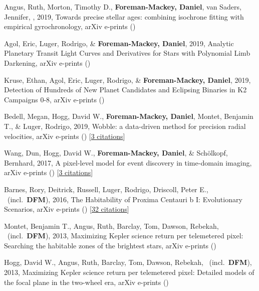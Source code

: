 \item[{\color{numcolor}\scriptsize8}] Angus, Ruth, Morton, Timothy D., \textbf{Foreman-Mackey, Daniel}, van Saders, Jennifer, \etal, 2019, Towards precise stellar ages: combining isochrone fitting with empirical gyrochronology, arXiv e-prints ()

\item[{\color{numcolor}\scriptsize7}] Agol, Eric, Luger, Rodrigo, \& \textbf{Foreman-Mackey, Daniel}, 2019, Analytic Planetary Transit Light Curves and Derivatives for Stars with Polynomial Limb Darkening, arXiv e-prints ()

\item[{\color{numcolor}\scriptsize6}] Kruse, Ethan, Agol, Eric, Luger, Rodrigo, \& \textbf{Foreman-Mackey, Daniel}, 2019, Detection of Hundreds of New Planet Candidates and Eclipsing Binaries in K2 Campaigns 0-8, arXiv e-prints ()

\item[{\color{numcolor}\scriptsize5}] Bedell, Megan, Hogg, David W., \textbf{Foreman-Mackey, Daniel}, Montet, Benjamin T., \& Luger, Rodrigo, 2019, Wobble: a data-driven method for precision radial velocities, arXiv e-prints () [\href{http://adsabs.harvard.edu/abs/2019arXiv190100503B}{3 citations}]

\item[{\color{numcolor}\scriptsize4}] Wang, Dun, Hogg, David W., \textbf{Foreman-Mackey, Daniel}, \& Sch{\"o}lkopf, Bernhard, 2017, A pixel-level model for event discovery in time-domain imaging, arXiv e-prints () [\href{http://adsabs.harvard.edu/abs/2017arXiv171002428W}{3 citations}]

\item[{\color{numcolor}\scriptsize3}] Barnes, Rory, Deitrick, Russell, Luger, Rodrigo, Driscoll, Peter E., \etal\ (incl.\ \textbf{DFM}), 2016, The Habitability of Proxima Centauri b I: Evolutionary Scenarios, arXiv e-prints () [\href{http://adsabs.harvard.edu/abs/2016arXiv160806919B}{32 citations}]

\item[{\color{numcolor}\scriptsize2}] Montet, Benjamin T., Angus, Ruth, Barclay, Tom, Dawson, Rebekah, \etal\ (incl.\ \textbf{DFM}), 2013, Maximizing Kepler science return per telemetered pixel: Searching the habitable zones of the brightest stars, arXiv e-prints ()

\item[{\color{numcolor}\scriptsize1}] Hogg, David W., Angus, Ruth, Barclay, Tom, Dawson, Rebekah, \etal\ (incl.\ \textbf{DFM}), 2013, Maximizing Kepler science return per telemetered pixel: Detailed models of the focal plane in the two-wheel era, arXiv e-prints ()